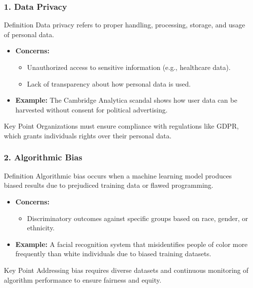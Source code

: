 \documentclass[aspectratio=169]{beamer}
\begin{document}
\begin{frame}[fragile]
    \frametitle{1. Data Privacy}
    \begin{block}{Definition}
        Data privacy refers to proper handling, processing, storage, and usage of personal data.
    \end{block}
    \begin{itemize}
        \item \textbf{Concerns:}
            \begin{itemize}
                \item Unauthorized access to sensitive information (e.g., healthcare data).
                \item Lack of transparency about how personal data is used.
            \end{itemize}
        \item \textbf{Example:} The Cambridge Analytica scandal shows how user data can be harvested without consent for political advertising.
    \end{itemize}
    \begin{block}{Key Point}
        Organizations must ensure compliance with regulations like GDPR, which grants individuals rights over their personal data.
    \end{block}
\end{frame}

\begin{frame}[fragile]
    \frametitle{2. Algorithmic Bias}
    \begin{block}{Definition}
        Algorithmic bias occurs when a machine learning model produces biased results due to prejudiced training data or flawed programming.
    \end{block}
    \begin{itemize}
        \item \textbf{Concerns:}
            \begin{itemize}
                \item Discriminatory outcomes against specific groups based on race, gender, or ethnicity.
            \end{itemize}
        \item \textbf{Example:} A facial recognition system that misidentifies people of color more frequently than white individuals due to biased training datasets.
    \end{itemize}
    \begin{block}{Key Point}
        Addressing bias requires diverse datasets and continuous monitoring of algorithm performance to ensure fairness and equity.
    \end{block}
\end{frame}
\end{document}
